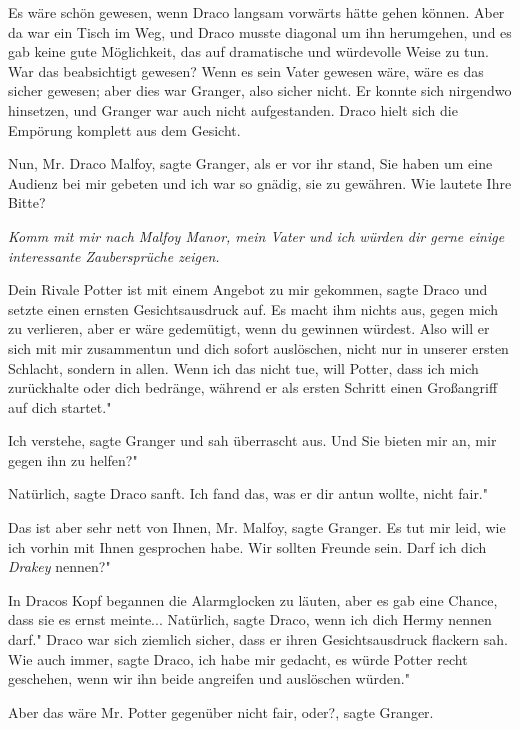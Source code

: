 Es wäre schön gewesen, wenn Draco langsam vorwärts hätte gehen können. Aber da
war ein Tisch im Weg, und Draco musste diagonal um ihn herumgehen, und es gab
keine gute Möglichkeit, das auf dramatische und würdevolle Weise zu tun. War das
beabsichtigt gewesen? Wenn es sein Vater gewesen wäre, wäre es das sicher
gewesen; aber dies war Granger, also sicher nicht. Er konnte sich nirgendwo
hinsetzen, und Granger war auch nicht aufgestanden. Draco hielt sich die
Empörung komplett aus dem Gesicht.

\glqq Nun, Mr. Draco Malfoy\grqq{}, sagte Granger, als er vor ihr stand, \glqq
Sie haben um eine Audienz bei mir gebeten und ich war so gnädig, sie zu
gewähren. Wie lautete Ihre Bitte?\grqq{}

\emph{Komm mit mir nach Malfoy Manor, mein Vater und ich würden dir gerne einige
interessante Zaubersprüche zeigen.}

\glqq Dein Rivale Potter ist mit einem Angebot zu mir gekommen\grqq{}, sagte
Draco und setzte einen ernsten Gesichtsausdruck auf. \glqq Es macht ihm nichts
aus, gegen mich zu verlieren, aber er wäre gedemütigt, wenn du gewinnen würdest.
Also will er sich mit mir zusammentun und dich sofort auslöschen, nicht nur in
unserer ersten Schlacht, sondern in allen. Wenn ich das nicht tue, will Potter,
dass ich mich zurückhalte oder dich bedränge, während er als ersten Schritt
einen Großangriff auf dich startet."

\glqq Ich verstehe\grqq{}, sagte Granger und sah überrascht aus. \glqq Und Sie
bieten mir an, mir gegen ihn zu helfen?"

\glqq Natürlich\grqq{}, sagte Draco sanft. \glqq Ich fand das, was er dir antun
wollte, nicht fair."

\glqq Das ist aber sehr nett von Ihnen, Mr. Malfoy\grqq{}, sagte Granger. \glqq
Es tut mir leid, wie ich vorhin mit Ihnen gesprochen habe. Wir sollten Freunde
sein. Darf ich dich \emph{Drakey} nennen?"

In Dracos Kopf begannen die Alarmglocken zu läuten, aber es gab eine Chance,
dass sie es ernst meinte... \glqq Natürlich\grqq{}, sagte Draco, \glqq wenn ich
dich Hermy nennen darf." Draco war sich ziemlich sicher, dass er ihren
Gesichtsausdruck flackern sah. \glqq Wie auch immer\grqq{}, sagte Draco, \glqq
ich habe mir gedacht, es würde Potter recht geschehen, wenn wir ihn beide
angreifen und auslöschen würden."

\glqq Aber das wäre Mr. Potter gegenüber nicht fair, oder?\grqq{}, sagte
Granger.

